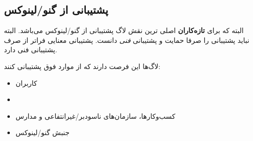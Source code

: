 
\subsection{پشتیبانی از گنو/لینوکس }

البته که برای
{\bfseries تازه‌کاران}
اصلی ترین نقش لاگ پشتیبانی از گنو/لینوکس می‌باشد.
البته نباید پشتیبانی را صرفا حمایت و پشتیبانی
{\itshape فنی}
دانست. پشتیبانی معنایی فراتر از صرف پشتیبانی فنی دارد.

لاگ‌ها این فرصت دارند که از موارد فوق پشتیبانی کنند:

\begin{itemize}
\item
کاربران
\item {}
\item
کسب‌وکارها، سازمان‌های ناسودبر/غیرانتفاعی و مدارس
\item
جنبش گنو/لینوکس
\end{itemize}

